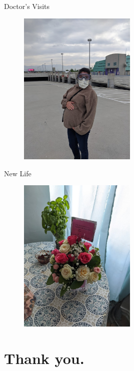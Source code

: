 \documentclass{beamer}
\begin{document}
\begin{frame}{Doctor's Visits}
\begin{figure}
\includegraphics[width=0.5\textwidth]{priscilla1.jpg}
\end{figure}
\end{frame}

\begin{frame}{New Life}
\begin{figure}
\includegraphics[width=0.5\textwidth]{flowers.jpg}
\end{figure}
\end{frame}

\section{Thank you.}
\end{document}
